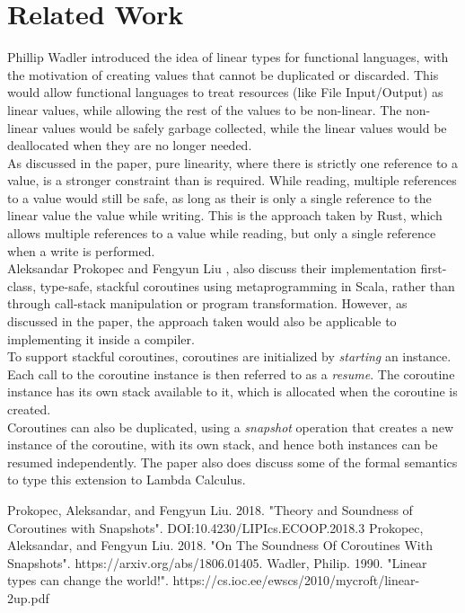 \documentclass[publish, nobox]{acmconf}
\begin{document}
\section*{Related Work}
Phillip Wadler \cite{wadler} introduced the idea of linear types for functional languages, with the motivation of creating values that cannot be duplicated or discarded. This would allow functional languages to treat resources (like File Input/Output) as linear values, while allowing the rest of the values to be non-linear. The non-linear values would be safely garbage collected, while the linear values would be deallocated when they are no longer needed. \\ 
As discussed in the paper, pure linearity, where there is strictly one reference to a value, is a stronger constraint than is required. While reading, multiple references to a value would still be safe, as long as their is only a single reference to the linear value the value while writing. This is the approach taken by Rust, which allows multiple references to a value while reading, but only a single reference when a write is performed. \\
Aleksandar Prokopec and Fengyun Liu \cite{soundnes},\cite{snapshots2} also discuss their implementation first-class, type-safe, stackful coroutines using metaprogramming in Scala, rather than through call-stack manipulation or program transformation. However, as discussed in the paper, the approach taken would also be applicable to implementing it inside a compiler. \\
To support stackful coroutines, coroutines are initialized by \textit{starting} an instance. Each call to the coroutine instance is then referred to as a \textit{resume}. The coroutine instance has its own stack available to it, which is allocated when the coroutine is created. \\
Coroutines can also be duplicated, using a \textit{snapshot} operation that creates a new instance of the coroutine, with its own stack, and hence both instances can be resumed independently. The paper also does discuss some of the formal semantics to type this extension to Lambda Calculus.\\

\vfill\null
\begin{thebibliography}{9}
Prokopec, Aleksandar, and Fengyun Liu. 2018. "Theory and Soundness of Coroutines with Snapshots". DOI:10.4230/LIPIcs.ECOOP.2018.3
Prokopec, Aleksandar, and Fengyun Liu. 2018. "On The Soundness Of Coroutines With Snapshots". https://arxiv.org/abs/1806.01405.
Wadler, Philip. 1990. "Linear types can change the world!". https://cs.ioc.ee/ewscs/2010/mycroft/linear-2up.pdf
\end{thebibliography}
\end{document}
